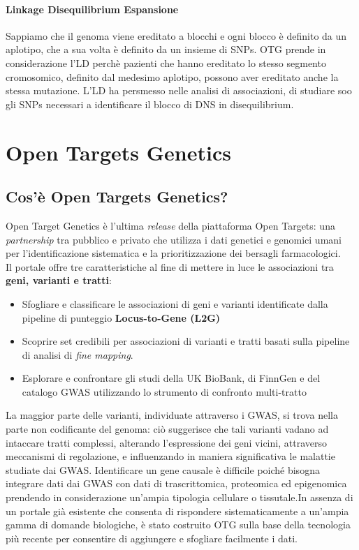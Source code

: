 \documentclass{article}
\begin{document}
\paragraph{Linkage Disequilibrium Espansione}
Sappiamo che il genoma viene ereditato a blocchi e ogni blocco è definito da un aplotipo, che a sua volta è definito da un insieme di SNPs. OTG prende in considerazione l'LD perchè pazienti che hanno ereditato lo stesso segmento cromosomico, definito dal medesimo aplotipo, possono aver ereditato anche la stessa mutazione. L'LD ha persmesso nelle analisi di associazioni, di studiare soo gli SNPs necessari a identificare il blocco di DNS in disequilibrium. 

\section{Open Targets Genetics}

\subsection{Cos'è Open Targets Genetics?}
Open Target Genetics è l'ultima \textit{release} della piattaforma Open Targets: una \textit{partnership} tra pubblico e privato che utilizza i dati genetici e genomici umani per l'identificazione sistematica e la prioritizzazione dei bersagli farmacologici.\\
Il portale offre tre caratteristiche al fine di mettere in luce le associazioni tra \textbf{geni, varianti e tratti}:
\begin{itemize}
    \item Sfogliare e classificare le associazioni di geni e varianti identificate dalla pipeline di punteggio \textbf{Locus-to-Gene (L2G)}
    \item Scoprire set credibili per associazioni di varianti e tratti basati sulla pipeline di analisi di \textit{fine mapping}.
    \item Esplorare e confrontare gli studi della UK BioBank, di FinnGen e del catalogo GWAS utilizzando lo strumento di confronto multi-tratto
\end{itemize} 

\begin{box3}
    [title={\textbf{La novità di OTG}}]
    {La maggior parte delle varianti, individuate attraverso i GWAS, si trova nella parte non codificante del genoma: ciò suggerisce che tali varianti vadano ad intaccare tratti complessi, alterando l'espressione dei geni vicini, attraverso meccanismi di regolazione, e influenzando in maniera significativa le malattie studiate dai GWAS. 
    Identificare un gene causale è difficile poiché bisogna integrare dati dai GWAS con dati di trascrittomica, proteomica ed epigenomica prendendo in considerazione un'ampia tipologia cellulare o tissutale.In assenza di un portale già esistente che consenta di rispondere sistematicamente a un'ampia gamma di domande biologiche, è stato costruito OTG sulla base della tecnologia più recente per consentire di aggiungere e sfogliare facilmente i dati.}
\end{box3}
\end{document}
